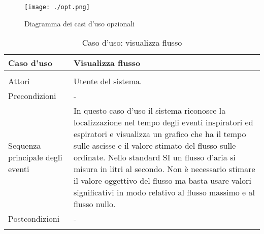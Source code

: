 \begin{figure}
 \centering
 \texttt{[image: ./opt.png]}
  \caption{Diagramma dei casi d'uso opzionali}
\label{opt}
\end{figure}



  \begin{table}
  \centering
  \begin{tabular}{p{} p{}}
  \\
  \hline
      Caso d'uso 
    & 
      Visualizza flusso
  \\
  \hline\\
      Attori
    &
      Utente del sistema. 
  \\
      Precondizioni
    &
      -
  \\
      Sequenza principale degli eventi
    &
      In questo caso d'uso il sistema riconosce la localizzazione nel tempo degli eventi inspiratori ed espiratori e visualizza un grafico che ha il tempo sulle ascisse e il valore stimato del flusso sulle ordinate. Nello standard SI un flusso d'aria si misura in litri al secondo. Non \`e necessario stimare il valore oggettivo del flusso ma basta usare valori significativi in modo relativo al flusso massimo e al flusso nullo.
  \\
      Postcondizioni
    &
      -
  \\\\
  \hline
  \end{tabular}
   \caption{Caso d'uso: visualizza flusso}
   \label{visualizzaFlusso}
   \end{table}





